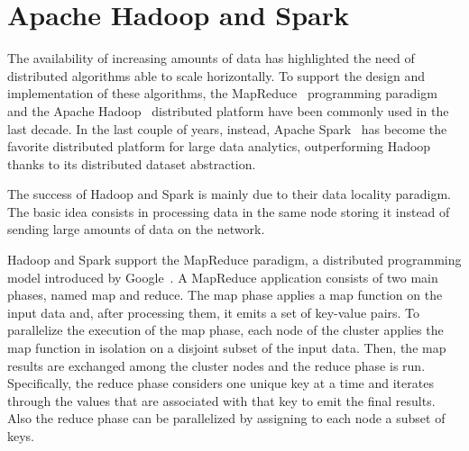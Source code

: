 \documentclass[preprint,review,12pt]{elsarticle}
\begin{document}
%


\section{Apache Hadoop and Spark}
\label{bigdata}
The availability of increasing amounts of data has highlighted the need of distributed algorithms able to scale horizontally.
To support the design and implementation of these algorithms, the MapReduce~\cite{ArticoloMapReduceGoogle} programming paradigm 
and the Apache Hadoop~\cite{HDFS} distributed platform have been commonly used in the last decade. 
In the last couple of years, instead, Apache Spark~\cite{Zaharia_spark}
has become the favorite distributed platform for large data analytics,
outperforming Hadoop thanks to its distributed dataset abstraction. 

The success of Hadoop and Spark is mainly due to their data locality paradigm. The basic idea consists in processing data in the same node storing it instead of sending large amounts of data on the network.

Hadoop and Spark support the MapReduce paradigm, a distributed programming model introduced by
Google~\cite{ArticoloMapReduceGoogle}.
A MapReduce application consists of two main phases,
named map and reduce. The map phase applies a map function on the input data and, after processing them, it emits a set of key-value pairs. 
To parallelize the execution of the map phase, each node of the cluster applies the map function in isolation on a disjoint subset of the input data. 
Then, the map results are exchanged among the cluster nodes and the reduce phase is run.
Specifically, the reduce phase considers one unique key at a time and iterates
through the values that are associated with that key to emit the final results. Also the reduce phase can be parallelized by assigning to each node a subset of keys.
\end{document}
